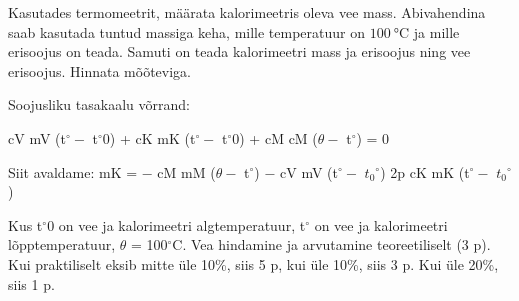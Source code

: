 
Kasutades termomeetrit, määrata kalorimeetris oleva vee mass. Abivahendina
saab kasutada tuntud massiga keha, mille temperatuur on
$\SI{100}{\celsius}$ ja mille erisoojus on teada. Samuti on teada
kalorimeetri mass ja erisoojus ning vee erisoojus. Hinnata mõõteviga.

\hint

\solu
Soojusliku tasakaalu võrrand:

cV mV (t$^\circ -$ t$^\circ$0) + cK mK (t$^\circ -$ t$^\circ$0) + cM cM ($\theta -$ t$^\circ$) = 0

Siit avaldame: mK = $-$ cM mM ($\theta -$ t$^\circ$) $-$ cV mV (t$^\circ -$ $t_0$$^\circ$) 2p cK mK (t$^\circ -$ $t_0$$^\circ$)

Kus t$^\circ$0 on vee ja kalorimeetri algtemperatuur, t$^\circ$ on vee ja kalorimeetri lõpptemperatuur, $\theta$ = 100$^\circ$C. Vea hindamine ja arvutamine teoreetiliselt (3 p). Kui praktiliselt eksib mitte üle 10\%, siis 5 p, kui üle 10\%, siis 3 p. Kui üle 20\%, siis 1 p.
\probend
